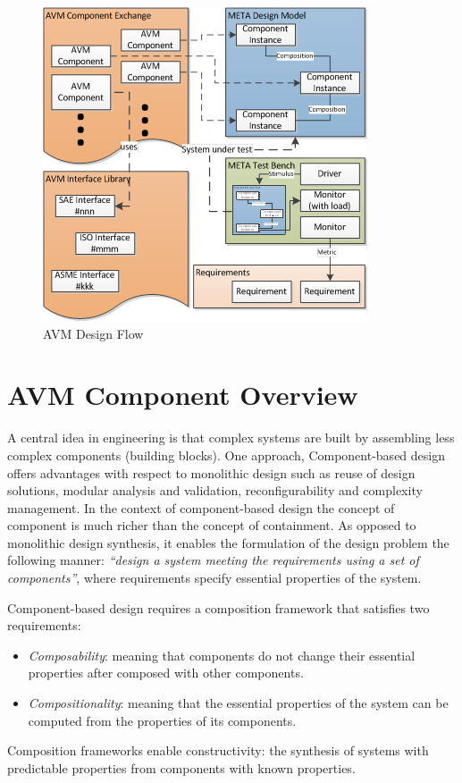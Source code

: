 \begin{figure}
\includegraphics{DesignFlow}
\caption{AVM Design Flow}
\label{Intro_DesignFlow}
\end{figure}

\section{AVM Component Overview}
A central idea in engineering is that complex systems are built by assembling less complex components (building blocks). One approach, Component-based design offers advantages with respect to monolithic design such as reuse of design solutions, modular analysis and validation, reconfigurability and complexity management. In the context of component-based design the concept of component is much richer than the concept of containment. As opposed to monolithic design synthesis, it enables the formulation of the design problem the following manner: \textit{“design a system meeting the requirements using a set of components”}, where requirements specify essential properties of the system.

Component-based design requires a composition framework that satisfies two requirements:
\begin{itemize}
\item \textit{Composability}: meaning that components do not change their essential properties after composed with other components.
\item \textit{Compositionality}: meaning that the essential properties of the system can be computed from the properties of its components.
\end{itemize}
Composition frameworks enable constructivity: the synthesis of systems with predictable properties from components with known properties.

